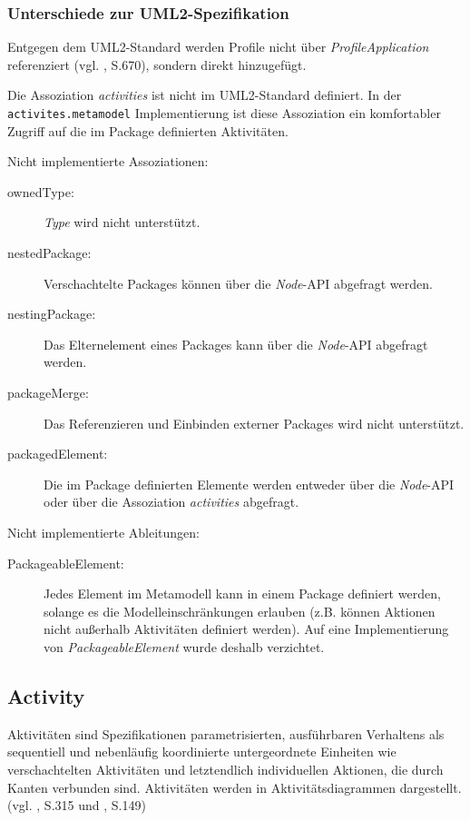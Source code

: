 \subsubsection{Unterschiede zur UML2-Spezifikation}
Entgegen dem UML2-Standard werden Profile nicht über \emph{ProfileApplication} referenziert (vgl. \citep{OMG2009}, S.670), sondern direkt hinzugefügt.

Die Assoziation \emph{activities} ist nicht im UML2-Standard definiert. In der \texttt{activites.metamodel} Implementierung ist diese Assoziation ein komfortabler Zugriff auf die im Package definierten Aktivitäten.

Nicht implementierte Assoziationen:
\begin{description}
\item[ownedType:] \emph{Type} wird nicht unterstützt.
\item[nestedPackage:] Verschachtelte Packages können über die \emph{Node}-API abgefragt werden.
\item[nestingPackage:] Das Elternelement eines Packages kann über die \emph{Node}-API abgefragt werden.
\item[packageMerge:] Das Referenzieren und Einbinden externer Packages wird nicht unterstützt.
\item[packagedElement:] Die im Package definierten Elemente werden entweder über die \emph{Node}-API oder über die Assoziation \emph{activities} abgefragt.
\end{description}

Nicht implementierte Ableitungen:
\begin{description}
\item[PackageableElement:] Jedes Element im Metamodell kann in einem Package definiert werden, solange es die Modelleinschränkungen erlauben (z.B. können Aktionen nicht außerhalb Aktivitäten definiert werden). Auf eine Implementierung von \emph{PackageableElement} wurde deshalb verzichtet.
\end{description}


\subsection{Activity}
Aktivitäten sind Spezifikationen parametrisierten, ausführbaren Verhaltens als sequentiell und nebenläufig koordinierte untergeordnete Einheiten wie verschachtelten Aktivitäten und letztendlich individuellen Aktionen, die durch Kanten verbunden sind. Aktivitäten werden in Aktivitätsdiagrammen dargestellt. (vgl. \citep{OMG2009}, S.315 und \citep{RumbaughJacobsonBooch2005}, S.149)

